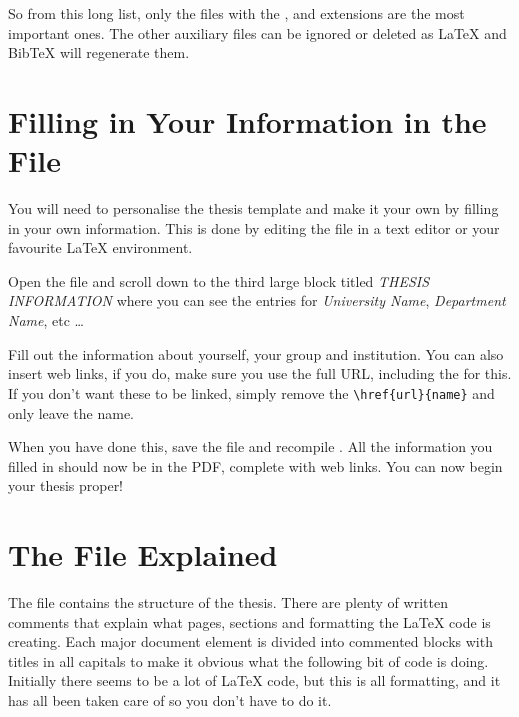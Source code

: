 So from this long list, only the files with the ,  and 
 extensions are the most important ones. The other auxiliary files 
can be ignored or deleted as \LaTeX{} and BibTeX will regenerate them.


\section{Filling in Your Information in the  File}\label{FillingFile}

You will need to personalise the thesis template and make it your own by filling 
in your own information. This is done by editing the  file in a 
text editor or your favourite LaTeX environment.

Open the file and scroll down to the third large block titled \emph{THESIS 
INFORMATION} where you can see the entries for \emph{University Name}, 
\emph{Department Name}, etc \ldots

Fill out the information about yourself, your group and institution. You can 
also insert web links, if you do, make sure you use the full URL, including the 
 for this. If you don't want these to be linked, simply remove the 
\verb|\href{url}{name}| and only leave the name.

When you have done this, save the file and recompile . All the 
information you filled in should now be in the PDF, complete with web links. You 
can now begin your thesis proper!


\section{The  File Explained}

The  file contains the structure of the thesis. There are plenty 
of written comments that explain what pages, sections and formatting the \LaTeX{} 
code is creating. Each major document element is divided into commented blocks 
with titles in all capitals to make it obvious what the following bit of code is 
doing. Initially there seems to be a lot of \LaTeX{} code, but this is all 
formatting, and it has all been taken care of so you don't have to do it.


